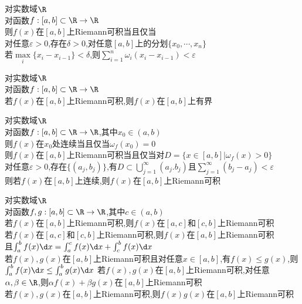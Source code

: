 \begin{dingli}
对实数域$\R$\\
对函数$f:[a,b]\subset \R \to \R$\\
则$f(x)$在$[a,b]$上Riemann可积当且仅当\\
对任意$\varepsilon>0$,存在$\delta>0$,对任意$[a,b]$上的分划$\{x_0,\cdots,x_n\}$\\
若$\max\limits_{i}\{x_i-x_{i-1}\}<\delta$,则$\sum\limits_{i=1}^{n}\omega_{i}(x_i-x_{i-1})<\varepsilon$
\end{dingli}

\begin{dingli}
对实数域$\R$\\
对函数$f:[a,b]\subset \R \to \R$\\
若$f(x)$在$[a,b]$上Riemann可积,则$f(x)$在$[a,b]$上有界
\end{dingli}

\begin{dingli}
对实数域$\R$\\
对函数$f:[a,b]\subset \R \to \R$,其中$x_0\in(a,b)$\\
则$f(x)$在$x_0$处连续当且仅当$\omega_{f}(x_0)=0$\\
则$f(x)$在$[a,b]$上Riemann可积当且仅当对$D=\{x\in[a,b]|\omega_{f}(x)>0\}$\\
对任意$\varepsilon>0$,存在$\{(a_j,b_j)\}$,有$D\subset\bigcup\limits_{j=1}^{\infty}(a_j.b_j)$且$\sum\limits_{j=1}^{\infty}(b_j-a_j)<\varepsilon$\\
则若$f(x)$在$[a,b]$上连续,则$f(x)$在$[a,b]$上Riemann可积
\end{dingli}

\begin{dingli}
对实数域$\R$\\
对函数$f,g:[a,b]\subset \R \to \R$,其中$c\in(a,b)$\\
若$f(x)$在$[a,b]$上Riemann可积,则$f(x)$在$[a,c]$和$[c,b]$上Riemann可积\\
若$f(x)$在$[a,c]$和$[c,b]$上Riemann可积,则$f(x)$在$[a,b]$上Riemann可积\\
且$\int_{a}^{b}f(x)\d x=\int_{a}^{c}f(x)\d x+\int_{c}^{b}f(x)\d x$\\
若$f(x),g(x)$在$[a,b]$上Riemann可积且对任意$x\in [a,b]$,有$f(x)\leq g(x)$,则$\int_{a}^{b}f(x)\d x\leq \int_{a}^{b}g(x)\d x$
若$f(x),g(x)$在$[a,b]$上Riemann可积,对任意$\alpha,\beta\in\R$,则$\alpha f(x)+\beta g(x)$在$[a,b]$上Riemann可积\\
若$f(x),g(x)$在$[a,b]$上Riemann可积,则$f(x)g(x)$在$[a,b]$上Riemann可积
\end{dingli}

